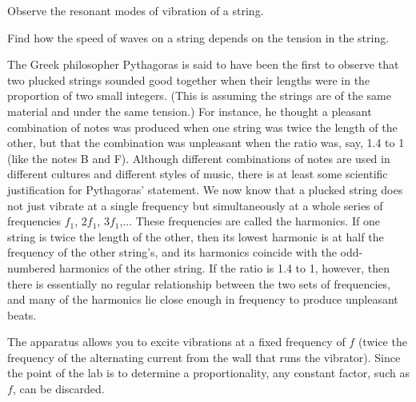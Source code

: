 \label{lab:standing-waves}

\apparatus
{}

\begin{goals}

\item[] Observe the resonant modes of vibration of a string.

\item[] Find how the speed of waves on a string depends on the
tension in the string.
\end{goals}

\introduction

The Greek philosopher Pythagoras is said to have been the
first to observe that two plucked strings sounded good
together when their lengths were in the proportion of two
small integers.  (This is assuming the strings are of the
same material and under the same tension.)  For instance, he
thought a pleasant combination of notes was produced when
one string was twice the length of the other, but that the
combination was unpleasant when the ratio was, say, 1.4 to 1
(like the notes B and F).  Although different combinations
of notes are used in different cultures and different styles
of music, there is at least some scientific justification
for Pythagoras' statement.  We now know that a plucked
string does not just vibrate at a single frequency but
simultaneously at a whole series of frequencies $f_1$,
$2f_1$, $3f_1$,...  These frequencies are called the
harmonics.  If one string is twice the length of the other,
then its lowest harmonic is at half the frequency of the
other string's, and its harmonics coincide with the
odd-numbered harmonics of the other string.  If the ratio is
1.4 to 1, however, then there is essentially no regular
relationship between the two sets of frequencies, and many
of the harmonics lie close enough in frequency to produce unpleasant beats.


\setup

The apparatus allows you to excite vibrations at a fixed
frequency of $f$ (twice the frequency of the alternating
current from the wall that runs the vibrator). Since the point of the lab
is to determine a proportionality, any constant factor, such as $f$, can
be discarded.

